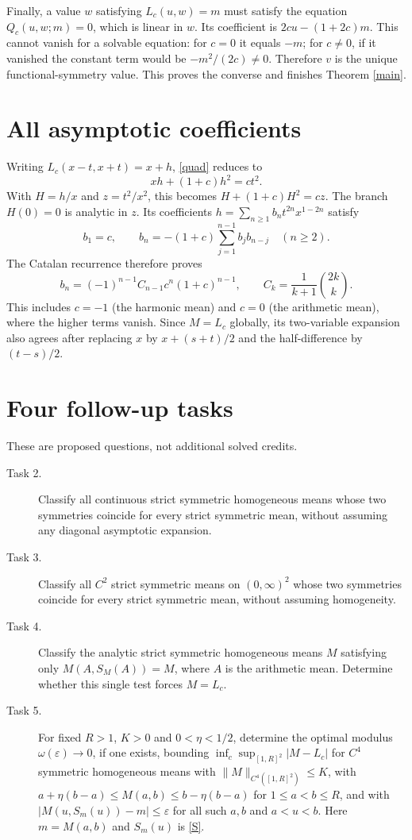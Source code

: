 \documentclass[11pt]{article}
\begin{document}
Finally, a value $w$ satisfying $L_c(u,w)=m$ must satisfy the equation
$Q_c(u,w;m)=0$, which is linear in $w$. Its coefficient is
$2cu-(1+2c)m$. This cannot vanish for a solvable equation: for $c=0$
it equals $-m$; for $c\ne0$, if it vanished the constant term would
be $-m^2/(2c)\ne0$. Therefore $v$ is the unique functional-symmetry
value. This proves the converse and finishes Theorem \ref{main}.

\section*{All asymptotic coefficients}
Writing $L_c(x-t,x+t)=x+h$, \eqref{quad} reduces to
\[
 xh+(1+c)h^2=ct^2.
\]
With $H=h/x$ and $z=t^2/x^2$, this becomes
$H+(1+c)H^2=cz$. The branch $H(0)=0$ is analytic in $z$.
Its coefficients $h=\sum_{n\ge1}b_n t^{2n}x^{1-2n}$ satisfy
\[
 b_1=c,\qquad
 b_n=-(1+c)\sum_{j=1}^{n-1}b_jb_{n-j}\quad(n\ge2).
\]
The Catalan recurrence therefore proves
\[
 b_n=(-1)^{n-1}C_{n-1}c^n(1+c)^{n-1},\qquad
 C_k=\frac1{k+1}\binom{2k}{k}.
\]
This includes $c=-1$ (the harmonic mean) and $c=0$ (the arithmetic
mean), where the higher terms vanish. Since $M=L_c$ globally, its
two-variable expansion also agrees after replacing $x$ by
$x+(s+t)/2$ and the half-difference by $(t-s)/2$.

\section*{Four follow-up tasks}
These are proposed questions, not additional solved credits.
\begin{description}
\item[Task 2.] Classify all continuous strict symmetric homogeneous
means whose two symmetries coincide for every strict symmetric mean,
without assuming any diagonal asymptotic expansion.
\item[Task 3.] Classify all $C^2$ strict symmetric means on
$(0,\infty)^2$ whose two symmetries coincide for every strict symmetric
mean, without assuming homogeneity.
\item[Task 4.] Classify the analytic strict symmetric homogeneous means
$M$ satisfying only $M(A,S_M(A))=M$, where $A$ is the arithmetic mean.
Determine whether this single test forces $M=L_c$.
\item[Task 5.] For fixed $R>1$, $K>0$ and $0<\eta<1/2$, determine the
optimal modulus $\omega(\varepsilon)\to0$, if one exists, bounding
$\inf_c\sup_{[1,R]^2}|M-L_c|$ for $C^4$ symmetric homogeneous means
with $\|M\|_{C^4([1,R]^2)}\le K$, with
$a+\eta(b-a)\le M(a,b)\le b-\eta(b-a)$ for $1\le a<b\le R$,
and with $|M(u,S_m(u))-m|\le\varepsilon$ for all such $a,b$ and
$a<u<b$. Here $m=M(a,b)$ and $S_m(u)$ is \eqref{S}.
\end{description}
\end{document}
